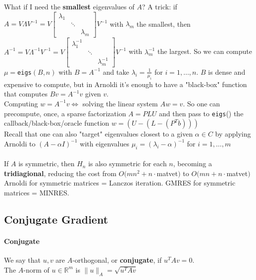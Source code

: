 \documentclass[10pt]{report}
\begin{document}
What if I need the \textbf{smallest} eigenvalues of $A$? A trick: if $A=V\Lambda V^{-1} = V\left[\begin{array}{ccc}
\lambda_1\\
&\ddots\\
& &\lambda_m
\end{array}\right]V^{-1}$ with $\lambda_m$ the smallest, then $A^{-1}=V\Lambda^{-1} V^{-1} = V\left[\begin{array}{ccc}
\lambda_1^{-1}\\
&\ddots\\
& &\lambda_m^{-1}
\end{array}\right]V^{-1}$ with $\lambda_m^{-1}$ the largest. So we can compute $\mu=$\texttt{eigs}$(B,n)$ with $B=A^{-1}$ and take $\lambda_i = \frac{1}{\mu_i}$ for $i=1,\ldots,n$. $B$ is dense and expensive to compute, but in Arnoldi it's enough to have a "black-box" function that computes $Bv=A^{-1}v$ given $v$.\\
Computing $w=A^{-1}v \Leftrightarrow$ solving the linear system $Aw=v$. So one can precompute, once, a sparse factorization $A=PLU$ and then pass to \texttt{eigs}() the callback/black-box/oracle function $w = (U-(L-(P^Tb)))$\\
Recall that one can also "target" eigenvalues closest to a given $\alpha\in C$ by applying Arnoldi to $(A-\alpha I)^{-1}$ with eigenvalues $\mu_i = (\lambda_i-\alpha)^{-1}$ for $i=1,\ldots,m$\\\\
If $A$ is symmetric, then $H_n$ is also symmetric for each $n$, becoming a \textbf{tridiagional}, reducing the cost from $O(mn^2+n\cdot$matvet$)$ to $O(mn+n\cdot$matvet$)$\\
Arnoldi for symmetric matrices = Lanczos iteration. GMRES for symmetric matrices = MINRES.
\subsection{Conjugate Gradient}
\paragraph{Conjugate} We say that $u,v$ are $A$-orthogonal, or \textbf{conjugate}, if $u^TAv = 0$.\\
The $A$-norm of $u\in \mathbb{R}^m$ is $\|u\|_A = \sqrt{u^TAv}$
\end{document}
